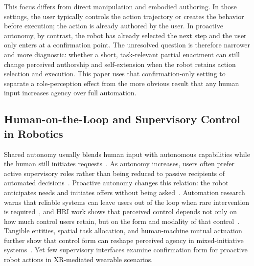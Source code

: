 \documentclass[sigconf,review,anonymous]{acmart}
\begin{document}
This focus differs from direct manipulation and embodied authoring. In those settings, the user typically controls the action trajectory or creates the behavior before execution; the action is already authored by the user. In proactive autonomy, by contrast, the robot has already selected the next step and the user only enters at a confirmation point. The unresolved question is therefore narrower and more diagnostic: whether a short, task-relevant partial enactment can still change perceived authorship and self-extension when the robot retains action selection and execution. This paper uses that confirmation-only setting to separate a role-perception effect from the more obvious result that any human input increases agency over full automation.

\subsection{Human-on-the-Loop and Supervisory Control in Robotics}
Shared autonomy usually blends human input with autonomous capabilities while the human still initiates requests~\cite{10.1145/3491102.3502085, 10.5555/3721488.3721596}. As autonomy increases, users often prefer active supervisory roles rather than being reduced to passive recipients of automated decisions~\cite{10.1145/3706598.3714112, 10.1145/3706598.3713765}. Proactive autonomy changes this relation: the robot anticipates needs and initiates offers without being asked~\cite{10.1145/3544548.3581124, 10.1145/3613904.3642911, 10.5555/2906831.2906844, baraglia2017efficient}. Automation research warns that reliable systems can leave users out of the loop when rare intervention is required~\cite{bainbridge1983ironies, endsley1995outofloop, parasuraman2000model, parasuraman2010complacency}, and HRI work shows that perceived control depends not only on how much control users retain, but on the form and modality of that control~\cite{10.1145/3491102.3517610, 10.1145/3491102.3517500}. Tangible entities, spatial task allocation, and human-machine mutual actuation further show that control form can reshape perceived agency in mixed-initiative systems~\cite{10.1145/3491102.3517449, 10.1145/3411764.3445355, 10.1145/3313831.3376705}. Yet few supervisory interfaces examine confirmation form for proactive robot actions in XR-mediated wearable scenarios.
\end{document}
